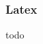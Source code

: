 \documentclass[FIPLY_base.tex]{subfiles}
\begin{document}
\subsubsection{Latex}
todo
\end{document}
